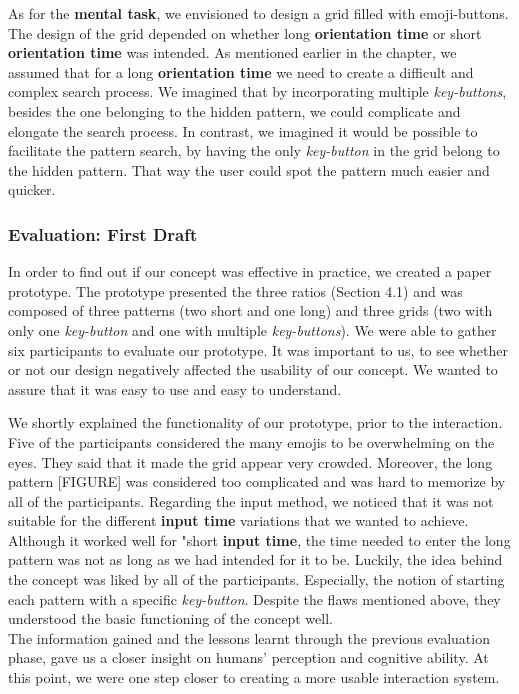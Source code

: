 As for the \textbf{mental task}, we envisioned to design a grid filled with emoji-buttons. The design of the grid depended on whether long \textbf{orientation time} or short \textbf{orientation time} was intended. As mentioned earlier in the chapter, we assumed that for a long \textbf{orientation time} we need to create a difficult and complex search process. We imagined that by incorporating multiple \textit{key-buttons}, besides the one belonging to the hidden pattern, we could complicate and elongate the search process. In contrast, we imagined it would be possible to facilitate the pattern search, by having the only \textit{key-button} in the grid belong to the hidden pattern. That way the user could spot the pattern much easier and quicker.

\subsubsection{Evaluation: First Draft} \label{4.2.2.2}
In order to find out if our concept was effective in practice, we created a paper prototype. The prototype presented the three ratios (Section 4.1) and was composed of three patterns (two short and one long) and three grids (two with only one \textit{key-button} and one with multiple \textit{key-buttons}). We were able to gather six participants to evaluate our prototype. It was important to us, to see whether or not our design negatively affected the usability of our concept. We wanted to assure that it was easy to use and easy to understand. 

We shortly explained the functionality of our prototype, prior to the interaction.
Five of the participants considered the many emojis to be overwhelming on the eyes. They said that it made the grid appear very crowded. Moreover, the long pattern [FIGURE] was considered too complicated and was hard to memorize by all of the participants. Regarding the input method, we noticed that it was not suitable for the different \textbf{input time} variations that we wanted to achieve. Although it worked well for "short \textbf{input time}, the time needed to enter the long pattern was not as long as we had intended for it to be. 
Luckily, the idea behind the concept was liked by all of the participants. Especially, the notion of starting each pattern with a specific \textit{key-button}. Despite the flaws mentioned above, they understood the basic functioning of the concept well. \\

The information gained and the lessons learnt through the previous evaluation phase, gave us a closer insight on humans' perception and cognitive ability. At this point, we were one step closer to creating a more usable interaction system.

